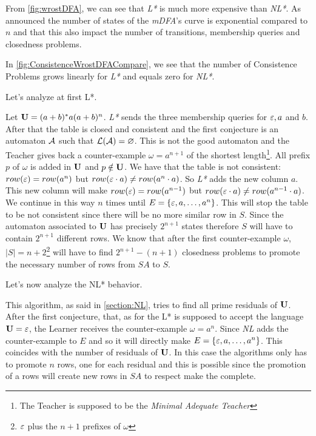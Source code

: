 From \cref{fig:wrostDFA}, we can see that \textit{L*} is much more expensive than \textit{NL*}. As announced the number of states of the \textit{mDFA}'s curve is exponential compared to $n$ and that this also impact the number of transitions, membership queries and closedness problems.

In \cref{fig:ConsistenceWrostDFACompare}, we see that the number of Consistence Problems grows linearly for \textit{L*} and equals zero for \textit{NL*}.

Let's analyze at first L*.

Let $\mathbf{U} = (a+b)^*a(a+b)^n$. \textit{L*} sends the three membership queries for $\varepsilon, a$ and $b$. After that the table is closed and consistent and the first conjecture is an automaton $\mathcal{A}$ such that $\mathcal{L}(\mathcal{A}) = \varnothing$. This is not the good automaton and the Teacher gives back a counter-example $\omega =  a^{n+1}$ of the shortest length\footnote{The Teacher is supposed to be the \textit{Minimal Adequate Teacher}}. All prefix $p$ of $\omega$ is added in $\mathbf{U}$ and $p \notin \mathbf{U}$. We have that the table is not consistent: $row(\varepsilon) = row(a^n)$ but $row(\varepsilon \cdot a) \neq row(a^n \cdot a)$. So \textit{L*} adds the new column $a$. This new column will make $row(\varepsilon) = row(a^{n-1})$ but $row(\varepsilon \cdot a) \neq row(a^{n-1} \cdot a)$. We continue in this way $n$ times until $E = \{\varepsilon, a, \dots, a^n\}$. This will stop the table to be not consistent since there will be no more similar row in $S$. Since the automaton associated to $\mathbf{U}$ has precisely $2^{n+1}$ states therefore $S$ will have to contain $2^{n+1}$ different rows. We know that after the first counter-example $\omega$, $|S| = n + 2$\footnote{$\varepsilon$ plus the $n+1$ prefixes of $\omega$} will have to find $2^{n+1}-(n+1)$ closedness problems to promote the necessary number of rows from $SA$ to $S$.

Let's now analyze the NL* behavior.

This algorithm, as said in \cref{section:NL}, tries to find all prime residuals of $\mathbf{U}$. After the first conjecture, that, as for the L* is supposed to accept the language $\mathbf{U} = \varepsilon$, the Learner receives the counter-example $\omega = a^n$. Since \textit{NL} adds the counter-example to $E$ and so it will directly make $E = \{\varepsilon, a, \dots, a^n\}$. This coincides with the number of residuals of $\mathbf{U}$. In this case the  algorithms only has to promote $n$ rows, one for each residual and this is possible since the promotion of a rows will create new rows in $SA$ to respect make the \OT complete.

